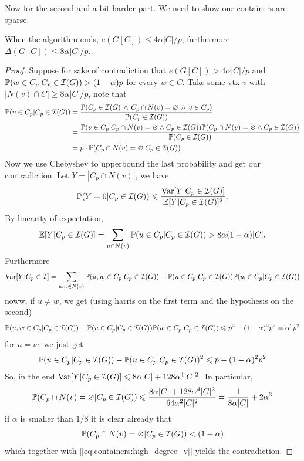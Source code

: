 Now for the second and a bit harder part. We need to show our
containers are sparse.
\begin{claim}
	When the algorithm ends, $e(G[C]) \leq 4\alpha|C|/p$, furthermore
	$\Delta(G[C]) \leq 8\alpha|C|/p$.
\end{claim}
\begin{proof}
	Suppose for sake of contradiction that $e(G[C]) > 4\alpha|C|/p$ and
	$\mathbb{P}(w \in C_p | C_p \in \mathcal{I}(G)) > (1-\alpha)p$ for every $w \in C$.
	Take some vtx $v$ with $|N(v) \cap C| \geq 8\alpha|C|/p$,
	note that
	\begin{align}
		\label{eq:containers:high_degree_v}
		\mathbb{P}(v \in C_p | C_p \in \mathcal{I}(G)) &= \frac{\mathbb{P}(C_p \in \mathcal{I}(G)
		\,\land\, C_p \cap N(v) = \varnothing \,\land\, v \in C_p )}{\mathbb{P}(C_p
		\in \mathcal{I}(G))}\\
		&= \frac{\mathbb{P}(v \in C_p | C_p \cap N(v) = \varnothing \land C_p \in
			\mathcal{I}(G))\mathbb{P}(C_p \cap N(v) = \varnothing \land C_p \in
		\mathcal{I}(G))}{\mathbb{P}(C_p \in \mathcal{I}(G))}\\
		&= p \cdot \mathbb{P}(C_p \cap N(v) = \varnothing|C_p \in \mathcal{I}(G))
	\end{align}
	Now we use Chebyshev to upperbound the last probability and get our
	contradiction. Let $Y = |C_p \cap N(v)|$, we have
	\[
		\mathbb{P}(Y = 0 | C_p \in \mathcal{I}(G)) \leqslant \frac{\mathrm{Var}[Y | C_p \in
		\mathcal{I}(G)]}{\mathbb{E}[Y| C_p \in \mathcal{I}(G)]^2}.
	\]
	By linearity of expectation,
	\[
		\mathbb{E}[Y | C_p \in \mathcal{I}(G)] = \sum_{u \in N(v)} \mathbb{P}(u \in C_p | C_p \in
		\mathcal{I}(G)) > 8\alpha(1-\alpha)|C|.
	\]
	Furthermore
	\[
		\mathrm{Var}[Y | C_p \in \mathcal{I}] = \sum_{u,w \in N(v)} \mathbb{P}(u,w \in C_p
		| C_p \in \mathcal{I}(G)) - \mathbb{P}(u \in C_p | C_p \in \mathcal{I}(G))\mathbb{P}(w \in C_p |
		C_p \in \mathcal{I}(G))
	\]
	noww, if $u \neq w$, we get (using harris on the first term and the
	hypothesis on the second)
	\[
		\mathbb{P}(u,w \in C_p | C_p \in \mathcal{I}(G)) - \mathbb{P}(u \in C_p | C_p \in
		\mathcal{I}(G))\mathbb{P}(w \in C_p | C_p \in \mathcal{I}(G)) \leqslant p^2 - (1 - \alpha)^2p^2
		= \alpha^2p^2
	\]
	for $u = w$, we just get
	\[
		\mathbb{P}(u \in C_p | C_p \in \mathcal{I}(G)) - \mathbb{P}(u \in C_p | C_p \in \mathcal{I}(G))^2
		\leqslant p - (1-\alpha)^2p^2
	\]
	So, in the end $\mathrm{Var}[Y | C_p \in \mathcal{I}(G)] \leqslant 8\alpha |C| +
	128\alpha^4|C|^2$.
	In particular,
	\[
		\mathbb{P}(C_p \cap N(v) = \varnothing|C_p \in \mathcal{I}(G)) \leqslant
		\frac{8\alpha|C|+ 128\alpha^4|C|^2}{64\alpha^2|C|^2} =
		\frac{1}{8\alpha|C|} + 2\alpha^3
	\]
	if $\alpha$ is smaller than $1/8$ it is clear already that
	\[
		\mathbb{P}(C_p \cap N(v) = \varnothing|C_p \in \mathcal{I}(G)) < (1-\alpha)
	\]
	which together with [\ref{eq:containers:high_degree_v}] yields the
	contradiction.

\end{proof}

